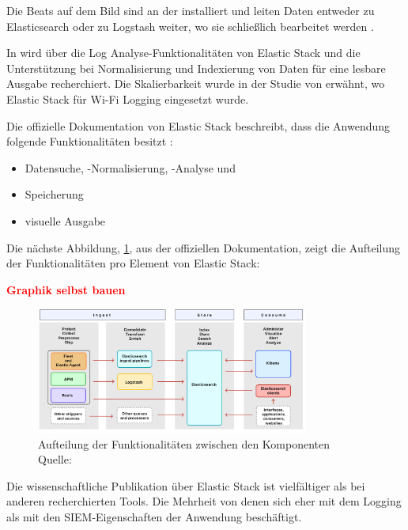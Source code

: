 Die Beats auf dem Bild sind an der  installiert und leiten Daten entweder zu Elasticsearch oder zu Logstash weiter, wo sie schließlich bearbeitet werden \citep{Jain_LMELK}. 

In \citep{Advani_elkstakc} wird über die Log Analyse-Funktionalitäten von Elastic Stack und die Unterstützung bei Normalisierung und Indexierung von Daten für eine lesbare Ausgabe recherchiert. Die Skalierbarkeit wurde in der Studie von \citep{Wang_elkwifi} erwähnt, wo Elastic Stack für Wi-Fi Logging eingesetzt wurde.

Die offizielle Dokumentation von Elastic Stack beschreibt, dass die Anwendung folgende Funktionalitäten besitzt \citep{elastic_docs}: 

\begin{itemize}[noitemsep]
   \item Datensuche, -Normalisierung, -Analyse und 
   \item Speicherung
   \item visuelle Ausgabe
\end{itemize}

Die  nächste Abbildung, \ref{fig:ElasticKomponenten}, aus der offiziellen Dokumentation, zeigt die Aufteilung der Funktionalitäten pro Element von Elastic Stack:

\textbf{\textcolor{red}{Graphik selbst bauen}}

\begin{figure}[H]
   \centering
   \includegraphics[width=0.8\textwidth]{assets/2_p9.png}
   \caption[Aufteilung der Funktionalitäten zwischen den Komponenten]
   {Aufteilung der Funktionalitäten zwischen den Komponenten\\Quelle: \citep{elastic_docs}}
   \label{fig:ElasticKomponenten}
   \centering
\end{figure}

Die wissenschaftliche Publikation über Elastic Stack ist vielfältiger als bei anderen recherchierten Tools. Die Mehrheit von denen sich eher mit dem Logging als mit den \gls{SIEM}-Eigenschaften der Anwendung beschäftigt.


